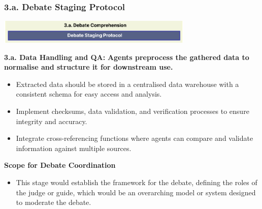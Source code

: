 \documentclass{beamer}
\begin{document}
\begin{frame}
\frametitle{3.a. Debate Staging Protocol}
\vspace{-0.5cm} %
\begin{center}
    \includegraphics[width=0.7\textwidth]{MAD-stage-3a.png}
\end{center}
\vspace{-0.3cm} %

\textbf{3.a. Data Handling and QA:} 
\small
    \textbf{Agents preprocess the gathered data to normalise and structure it for downstream use.}
    \begin{itemize}
        \item Extracted data should be stored in a centralised data warehouse with a consistent schema for easy access and analysis.
        \item Implement checksums, data validation, and verification processes to ensure integrity and accuracy.
        \item Integrate cross-referencing functions where agents can compare and validate information against multiple sources.
    \end{itemize}

\textbf{Scope for Debate Coordination} 
\small
    \begin{itemize} 
        \item This stage would establish the framework for the debate, defining the roles of the judge or guide, which would be an overarching model or system designed to moderate the debate.
    \end{itemize}
\end{frame}
\end{document}
